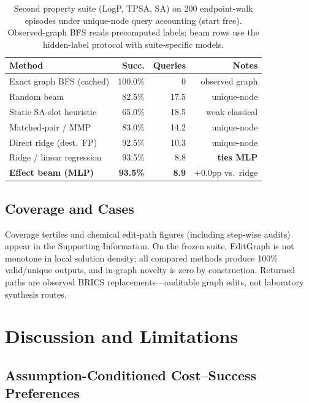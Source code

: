 \documentclass[journal=jcisd8,manuscript=article,email=false]{achemso}
\begin{document}
\begin{table}[t]
\caption{Second property suite (LogP, TPSA, SA) on 200 endpoint-walk episodes under unique-node query accounting (start free). Observed-graph BFS reads precomputed labels; beam rows use the hidden-label protocol with suite-specific models.}
\label{tab:suite_b}
\centering
\small
\begin{tabular}{lrrr}
\toprule
Method & Succ. & Queries & Notes \\
\midrule
Exact graph BFS (cached) & 100.0\% & 0 & observed graph \\
Random beam & 82.5\% & 17.5 & unique-node \\
Static SA-slot heuristic & 65.0\% & 18.5 & weak classical \\
Matched-pair / MMP & 83.0\% & 14.2 & unique-node \\
Direct ridge (dest.\ FP) & 92.5\% & 10.3 & unique-node \\
Ridge / linear regression & 93.5\% & 8.8 & \textbf{ties MLP} \\
\textbf{Effect beam (MLP)} & \textbf{93.5\%} & \textbf{8.9} & $+0.0$pp vs.\ ridge \\
\bottomrule
\end{tabular}
\end{table}


\subsection{Coverage and Cases}
\label{sec:cases}

Coverage tertiles and chemical edit-path figures (including step-wise audits) appear in the Supporting Information. On the frozen suite, EditGraph is not monotone in local solution density; all compared methods produce 100\% valid/unique outputs, and in-graph novelty is zero by construction. Returned paths are observed BRICS replacements---auditable graph edits, not laboratory synthesis routes.

\section{Discussion and Limitations}
\label{sec:limitations}

\subsection{Assumption-Conditioned Cost--Success Preferences}
\label{sec:regimes}
\end{document}
